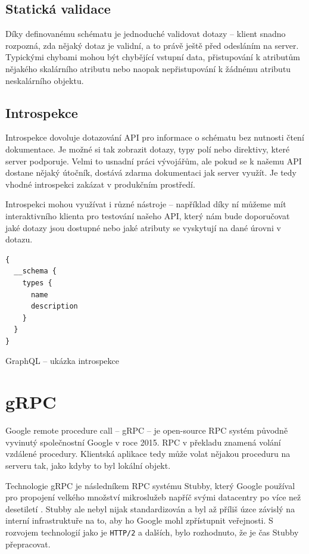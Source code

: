\documentclass[thesis=M,czech]{FITthesis}[2019/12/23]
\begin{document}
\subsection{Statická validace}
Díky definovanému schématu je jednoduché validovat dotazy -- klient snadno rozpozná, zda nějaký dotaz je validní, a to právě ještě před odesláním na server. Typickými chybami mohou být chybějící vstupní data, přistupování k atributům nějakého skalárního atributu nebo naopak nepřistupování k žádnému atributu neskalárního objektu.

\subsection{Introspekce}
\begin{sloppypar}
Introspekce dovoluje dotazování API pro informace o schématu bez nutnosti čtení dokumentace. Je možné si tak zobrazit dotazy, typy polí nebo direktivy, které server podporuje. Velmi to usnadní práci vývojářům, ale pokud se k našemu API dostane nějaký útočník, dostává zdarma dokumentaci jak server využít. Je tedy vhodné introspekci zakázat v produkčním prostředí.
\end{sloppypar}
Introspekci mohou využívat i různé nástroje -- například díky ní můžeme mít interaktivního klienta pro testování našeho API, který nám bude doporučovat jaké dotazy jsou dostupné  nebo jaké atributy se vyskytují na dané úrovni v dotazu.

\begin{listing}[H]
\begin{verbatim}
{
  __schema {
    types {
      name
      description 
    }
  }
}
\end{verbatim}
\caption{GraphQL -- ukázka introspekce}
\label{lst:graphql_introspection}
\end{listing}

\section{gRPC}
Google remote procedure call -- gRPC -- je open-source RPC systém původně vyvinutý společnostní Google v roce 2015. RPC v překladu znamená volání vzdálené procedury. Klientská aplikace tedy může volat nějakou proceduru na serveru tak, jako kdyby to byl lokální objekt.

Technologie gRPC je následníkem RPC systému Stubby, který Google používal pro propojení velkého množství mikroslužeb napříč svými datacentry po více než desetiletí \cite{grpc}. Stubby ale nebyl nijak standardizován a byl až příliš úzce závislý na interní infrastruktuře na to, aby ho Google mohl zpřístupnit veřejnosti. S rozvojem technologií jako je \texttt{HTTP/2} a dalších, bylo rozhodnuto, že je čas Stubby přepracovat.
\end{document}
